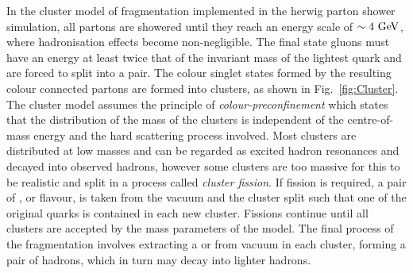 In the cluster model of fragmentation implemented in the \acrshort{herwig} parton shower simulation, all partons are showered until they reach an energy scale of $\sim4\mathrm{~Ge\hspace{-.08em}V}^{}$, where hadronisation effects become non-negligible.
The final state gluons must have an energy at least twice that of the invariant mass of the lightest quark and are forced to split into a \qqbar{} pair.
The colour singlet states formed by the resulting colour connected partons are formed into clusters, as shown in Fig.~\ref{fig:Cluster}.
The cluster model assumes the principle of \textit{colour-preconfinement} which states that the distribution of the mass of the clusters is independent of the centre-of-mass energy and the hard scattering process involved.
Most clusters are distributed at low masses and can be regarded as excited hadron resonances and decayed into observed hadrons, however some clusters are too massive for this to be realistic and split in a process called \textit{cluster fission}.
If fission is required, a \qqbar{} pair of \uquark{}, \dquark{} or \squark{} flavour, is taken from the vacuum and the cluster split such that one of the original quarks is contained in each new cluster.
Fissions continue until all clusters are accepted by the mass parameters of the model.
The final process of the fragmentation involves extracting a \qqbar{} or \qqqbarqbar{} from vacuum in each cluster, forming a pair of hadrons, which in turn may decay into lighter hadrons.

